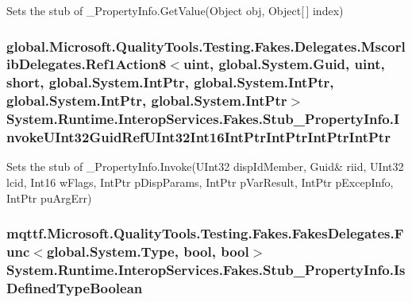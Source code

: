 Sets the stub of \-\_\-\-Property\-Info.\-Get\-Value(\-Object obj, Object\mbox{[}$\,$\mbox{]} index)

\hypertarget{class_system_1_1_runtime_1_1_interop_services_1_1_fakes_1_1_stub___property_info_a99b43a0a140e6432fcea8f95d7f66056}{
\subsubsection[{Invoke\-U\-Int32\-Guid\-Ref\-U\-Int32\-Int16\-Int\-Ptr\-Int\-Ptr\-Int\-Ptr\-Int\-Ptr}]{\setlength{\rightskip}{0pt plus 5cm}global.\-Microsoft.\-Quality\-Tools.\-Testing.\-Fakes.\-Delegates.\-Mscorlib\-Delegates.\-Ref1\-Action8$<$uint, global.\-System.\-Guid, uint, short, global.\-System.\-Int\-Ptr, global.\-System.\-Int\-Ptr, global.\-System.\-Int\-Ptr, global.\-System.\-Int\-Ptr$>$ System.\-Runtime.\-Interop\-Services.\-Fakes.\-Stub\-\_\-\-Property\-Info.\-Invoke\-U\-Int32\-Guid\-Ref\-U\-Int32\-Int16\-Int\-Ptr\-Int\-Ptr\-Int\-Ptr\-Int\-Ptr}}\label{class_system_1_1_runtime_1_1_interop_services_1_1_fakes_1_1_stub___property_info_a99b43a0a140e6432fcea8f95d7f66056}


Sets the stub of \-\_\-\-Property\-Info.\-Invoke(U\-Int32 disp\-Id\-Member, Guid\& riid, U\-Int32 lcid, Int16 w\-Flags, Int\-Ptr p\-Disp\-Params, Int\-Ptr p\-Var\-Result, Int\-Ptr p\-Excep\-Info, Int\-Ptr pu\-Arg\-Err)

\hypertarget{class_system_1_1_runtime_1_1_interop_services_1_1_fakes_1_1_stub___property_info_a5be8beda0c48944bec1a86902d10a390}{
\subsubsection[{Is\-Defined\-Type\-Boolean}]{\setlength{\rightskip}{0pt plus 5cm}mqttf.\-Microsoft.\-Quality\-Tools.\-Testing.\-Fakes.\-Fakes\-Delegates.\-Func$<$global.\-System.\-Type, bool, bool$>$ System.\-Runtime.\-Interop\-Services.\-Fakes.\-Stub\-\_\-\-Property\-Info.\-Is\-Defined\-Type\-Boolean}}\label{class_system_1_1_runtime_1_1_interop_services_1_1_fakes_1_1_stub___property_info_a5be8beda0c48944bec1a86902d10a390}


